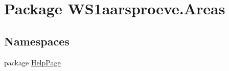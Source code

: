 \hypertarget{namespace_w_s1aarsproeve_1_1_areas}{}\section{Package W\+S1aarsproeve.\+Areas}
\label{namespace_w_s1aarsproeve_1_1_areas}
\subsection*{Namespaces}
\begin{DoxyCompactItemize}
\item 
package \hyperlink{namespace_w_s1aarsproeve_1_1_areas_1_1_help_page}{Help\+Page}
\end{DoxyCompactItemize}
